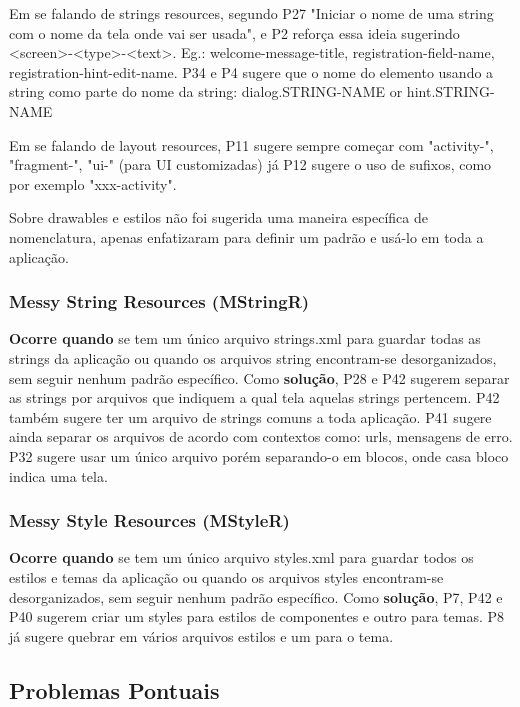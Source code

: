 Em se falando de strings resources, segundo P27 "Iniciar o nome de uma string com o nome da tela onde vai ser usada", e P2 refor\c{c}a essa ideia sugerindo <screen>-<type>-<text>. Eg.: welcome-message-title, registration-field-name, registration-hint-edit-name. P34 e P4 sugere que o nome do elemento usando a string como parte do nome da string: dialog.STRING-NAME or hint.STRING-NAME

Em se falando de layout resources, P11 sugere sempre come\c{c}ar com "activity-", "fragment-", "ui-" (para UI customizadas) j\'a P12 sugere o uso de sufixos, como por exemplo "xxx-activity".

Sobre drawables e estilos n\~ao foi sugerida uma maneira espec\'ifica de nomenclatura, apenas enfatizaram para definir um padr\~ao e us\'a-lo em toda a aplica\c{c}\~ao.


\subsubsection{Messy String Resources (MStringR)} 

\textbf{Ocorre quando} se tem um \'unico arquivo strings.xml para guardar todas as strings da aplica\c{c}\~ao ou quando os arquivos string encontram-se desorganizados, sem seguir nenhum padr\~ao espec\'ifico. Como \textbf{solu\c{c}\~ao}, P28 e P42 sugerem separar as strings por arquivos que indiquem a qual tela aquelas strings pertencem. P42 tamb\'em sugere ter um arquivo de strings comuns a toda aplica\c{c}\~ao. P41 sugere ainda separar os arquivos de acordo com contextos como: urls, mensagens de erro. P32 sugere usar um \'unico arquivo por\'em separando-o em blocos, onde casa bloco indica uma tela.



\subsubsection{Messy Style Resources (MStyleR)} 

\textbf{Ocorre quando} se tem um \'unico arquivo styles.xml para guardar todos os estilos e temas da aplica\c{c}\~ao ou quando os arquivos styles encontram-se desorganizados, sem seguir nenhum padr\~ao espec\'ifico. Como \textbf{solu\c{c}\~ao}, P7, P42 e P40 sugerem criar um styles para estilos de componentes e outro para temas. P8 j\'a sugere quebrar em v\'arios arquivos estilos e um para o tema.



\subsection{Problemas Pontuais}

